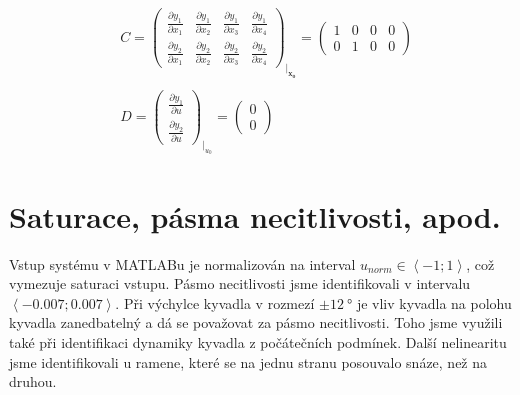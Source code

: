 \documentclass[11pt,a4paper]{article}
\begin{document}
{\begin{align*}
&C =
\begin{pmatrix}
\frac{\partial y_1}{\partial x_1} & \frac{\partial y_1}{\partial x_2} & \frac{\partial y_1}{\partial x_3} & \frac{\partial y_1}{\partial x_4}	\\
\frac{\partial y_2}{\partial x_1} & \frac{\partial y_2}{\partial x_2} & \frac{\partial y_2}{\partial x_3} & \frac{\partial y_2}{\partial x_4}
\end{pmatrix}_{\biggr\rvert_\mathbf{x_0}} =
\left(\begin{array}{cccc} 1 & 0 & 0 & 0\\ 0 & 1 & 0 & 0 \end{array}\right)	\\ \\
&D =
\begin{pmatrix}
\frac{\partial y_1}{\partial u}	\\
\frac{\partial y_2}{\partial u}
\end{pmatrix}_{\biggr\rvert_{u_0}} =
\left(\begin{array}{c} 0\\ 0 \end{array}\right)
\end{align*}
}

\newpage
\section{Saturace, pásma necitlivosti, apod.}
Vstup systému v MATLABu je normalizován na interval $u_{norm} \in \left<-1; 1\right>$, což vymezuje saturaci vstupu. Pásmo necitlivosti jsme identifikovali v intervalu $\left<-0.007; 0.007\right>$.
\newline
\newline
Při výchylce kyvadla v rozmezí $\pm \SI{12}{\degree}$ je vliv kyvadla na polohu kyvadla zanedbatelný a dá se považovat za pásmo necitlivosti. Toho jsme využili také při identifikaci dynamiky kyvadla z počátečních podmínek.
\newline
\newline
Další nelinearitu jsme identifikovali u ramene, které se na jednu stranu posouvalo snáze, než na druhou.
\end{document}
